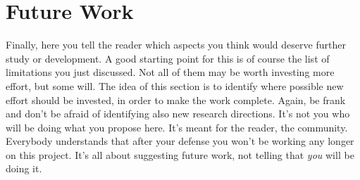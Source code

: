 \section{Future Work}
Finally, here you tell the reader which aspects you think would deserve further study or development. A good starting point for this is of course the list of limitations you just discussed. Not all of them may be worth investing more effort, but some will. The idea of this section is to identify where possible new effort should be invested, in order to make the work complete. Again, be frank and don't be afraid of identifying also new research directions. It's not you who will be doing what you propose here. It's meant for the reader, the community. Everybody understands that after your defense you won't be working any longer on this project. It's all about suggesting future work, not telling that \emph{you} will be doing it. 
